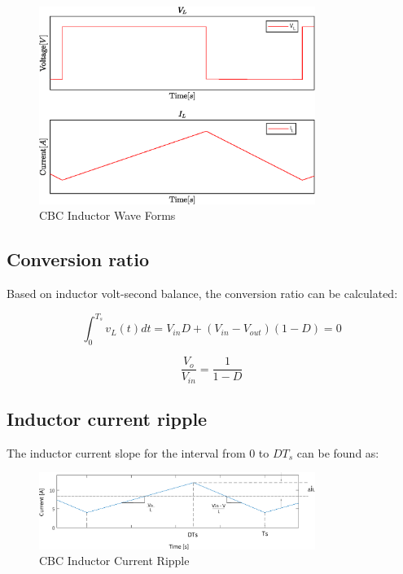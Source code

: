 \begin{figure}[H]
   \centering
   \includegraphics[width=0.8\textwidth]{figures/aConventionalBoost/LvAndLi.eps}
    \caption{CBC Inductor Wave Forms}
	\label{fig:CBC_InductorWaveForms}
\end{figure}

\subsection{Conversion ratio}\label{sec:conversionRatio}

Based on inductor volt-second balance, the conversion ratio can be calculated:

\begin{equation}
	\int_{0}^{T_s} v_L(t)dt = V_{in}D + (V_{in}-V_{out})(1-D) = 0
	\label{eq:CBC_VISB}
\end{equation}

\begin{equation}
	\frac{V_o}{V_{in}} = \frac{1}{1-D}
	\label{eq:CBC_CR}
\end{equation}

\subsection{Inductor current ripple}\label{sec:CBC_ICR}

The inductor current slope for the interval from 0 to $DT_s$ can be found as:

\begin{figure}[H]
   \centering
   \includegraphics[width=0.8\textwidth]{figures/aConventionalBoost/InductorCurrent.pdf}
    \caption{CBC Inductor Current Ripple}
	\label{fig:CBC_InductorCurrent}
\end{figure}


